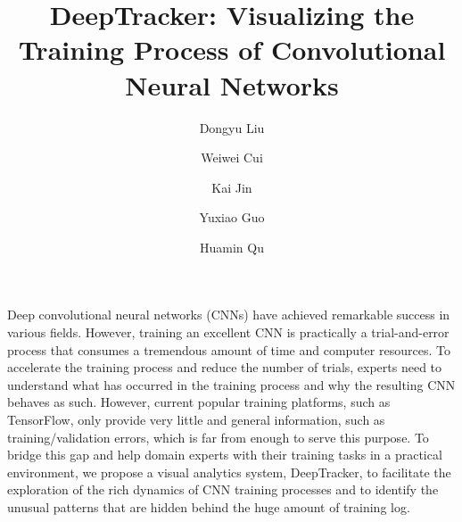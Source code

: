\documentclass[format=acmsmall, review=false, screen=true]{acmart}
\newcommand{\name}{{DeepTracker}\xspace}
\begin{document}
	\title{\name: Visualizing the Training Process of Convolutional Neural Networks}  
	\author{Dongyu Liu}
	\author{Weiwei Cui}
	\author{Kai Jin}
	\author{Yuxiao Guo}
	\author{Huamin Qu}
	
Deep convolutional neural networks (CNNs) have achieved remarkable success in various fields. 
However, training an excellent CNN is practically a trial-and-error process that consumes a tremendous amount of time and computer resources.
To accelerate the training process and reduce the number of trials, experts need to understand what has occurred in the training process and why the resulting CNN behaves as such.
However, current popular training platforms, such as TensorFlow, only provide very little and general information, such as training/validation errors, which is far from enough to serve this purpose.
To bridge this gap and help domain experts with their training tasks in a practical environment, we propose a visual analytics system, \name, to facilitate the exploration of the rich dynamics of CNN training processes and to identify the unusual patterns that are hidden behind the huge amount of training log.
\end{document}
